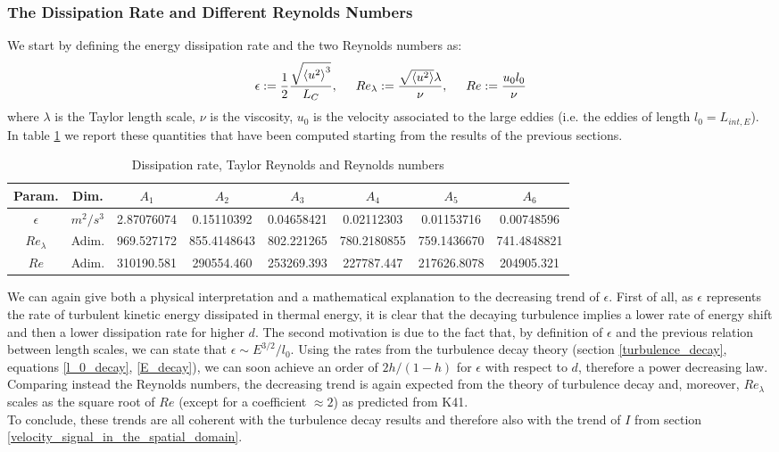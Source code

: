 \documentclass[11pt,titlepage]{article}
\begin{document}
\subsubsection{The Dissipation Rate and Different Reynolds Numbers}
We start by defining the energy dissipation rate and the two Reynolds numbers as:
\begin{equation*}
	\epsilon:=\frac{1}{2} \frac{\sqrt{\left< u^2 \right >^3}}{L_C}, \hspace{5mm} Re_{\lambda} := \frac{\sqrt{\left < u^2\right > } \lambda}{\nu}, \hspace{5mm} Re := \frac{u_0 l_0}{\nu}
\end{equation*}
where $\lambda$ is the Taylor length scale, $\nu$ is the viscosity, $u_0$ is the velocity associated to the large eddies (i.e. the eddies of length $l_0=L_{int,E}$).
In table \ref{tab4} we report these quantities that have been computed starting from the results of the previous sections. \\

\begin{table}[h!]
\centering
\caption{Dissipation rate, Taylor Reynolds and Reynolds numbers} \label{tab4}
    \begin{tabular}{ | c | c | c | c | c | c | c | c |}
        \hline
        Param. & Dim. & $A_1$ & $A_2$ & $A_3$ & $A_4$ & $A_5$ & $A_6$ \\
        \hline
        $\epsilon$ & $m^2/s^3$&2.87076074& 0.15110392& 0.04658421& 0.02112303& 0.01153716 &0.00748596  \\
        \hline
        $Re_\lambda$ & Adim. & 969.527172 & 855.4148643& 802.221265 & 780.2180855& 759.1436670&
        741.4848821 \\
        \hline
        $Re$& Adim. &310190.581 & 290554.460& 253269.393 &227787.447&
        217626.8078 &204905.321 \\
        \hline
    \end{tabular}
\end{table}
We can again give both a physical interpretation and a mathematical explanation to the decreasing trend of $\epsilon$. First of all, as $\epsilon$ represents the rate of turbulent kinetic energy dissipated in thermal energy, it is clear that the decaying turbulence implies a lower rate of energy shift and then a lower dissipation rate for higher $d$. The second motivation is due to the fact that, by definition of $\epsilon$ and the previous relation between length scales, we can state that $\epsilon \sim E^{3/2}/l_0$. Using the rates from the turbulence decay theory (section \ref{turbulence_decay}, equations \ref{l_0_decay}, \ref{E_decay}), we can soon achieve an order of $2h/(1-h)$ for $\epsilon$ with respect to $d$, therefore a power decreasing law. \\
Comparing instead the Reynolds numbers, the decreasing trend is again expected from the theory of turbulence decay and, moreover, $Re_{\lambda}$ scales as the square root of $Re$ (except for a coefficient $\approx 2$) as predicted from K41. \\
To conclude, these trends are all coherent with the turbulence decay results and therefore also with the trend of $I$ from section \ref{velocity_signal_in_the_spatial_domain}.
\end{document}
